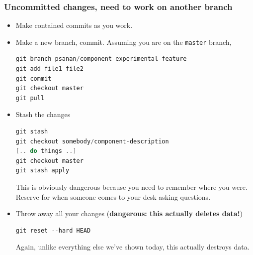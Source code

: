 \documentclass{beamer}
\begin{document}
\begin{frame}[fragile]
\frametitle{Uncommitted changes, need to work on another branch}
\begin{itemize}
\item Make contained commits as you work. 
\item Make a new branch, commit. Assuming you are on the \texttt{master} branch,
\begin{lstlisting}[language=C++]
git branch psanan/component-experimental-feature
git add file1 file2
git commit 
git checkout master 
git pull
\end{lstlisting}
\item Stash the changes
\begin{lstlisting}[language=C++]
git stash
git checkout somebody/component-description
[.. do things ..]
git checkout master
git stash apply
\end{lstlisting}
This is obviously dangerous because you need to remember where you were. Reserve for when someone comes to your desk asking questions.
\item Throw away all your changes (\textbf{dangerous: this actually deletes data!})
\begin{lstlisting}[language=C++]
git reset --hard HEAD
\end{lstlisting}
Again, unlike everything else we've shown today, this actually destroys data.
\end{itemize}
\end{frame}
\end{document}
